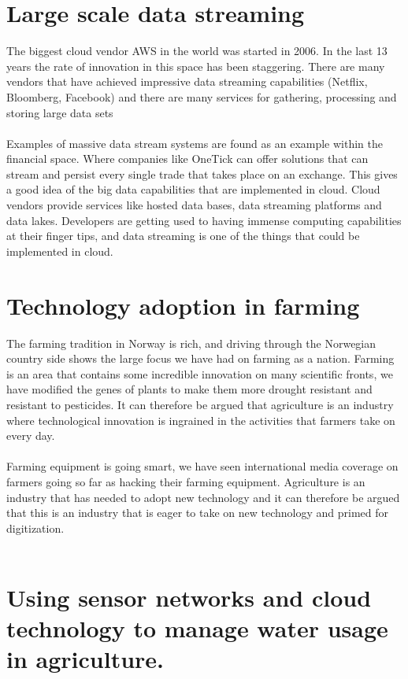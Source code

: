 \documentclass[]{uiophd}
\begin{document}
\section{Large scale data streaming }
The biggest cloud vendor AWS in the world was started in 2006. \cite{Gartner} In the last 13 years the rate of innovation in this space has been staggering. \cite{AWS} There are many vendors that have achieved impressive data streaming capabilities (Netflix, Bloomberg, Facebook) and there are many services for gathering, processing and storing large data sets
\\\\
Examples of massive data stream systems are found as an example within the financial space. Where companies like OneTick can offer solutions that can stream and persist every single trade that takes place on an exchange. This gives a good idea of the big data capabilities that are implemented in cloud. \cite{OneTick} Cloud vendors provide services like hosted data bases, data streaming platforms and data lakes. Developers are getting used to having immense computing capabilities at their finger tips, and data streaming is one of the things that could be implemented in cloud.  
\section{Technology adoption in farming}
The farming tradition in Norway is rich, and driving through the Norwegian country side shows the large focus we have had on farming as a nation. Farming is an area that contains some incredible innovation on many scientific fronts, we have modified the genes of plants to make them more drought resistant and resistant to pesticides. It can therefore be argued that agriculture is an industry where technological innovation is ingrained in the activities that farmers take on every day.
\\\\
Farming equipment is going smart, we have seen international media coverage on farmers going so far as hacking their farming equipment. Agriculture is an industry that has needed to adopt new technology and it can therefore be argued that this is an industry that is eager to take on new technology and primed for digitization.\cite{motherboard}
\\\\

\section{Using sensor networks and cloud technology to manage water usage in agriculture.}
\end{document}
